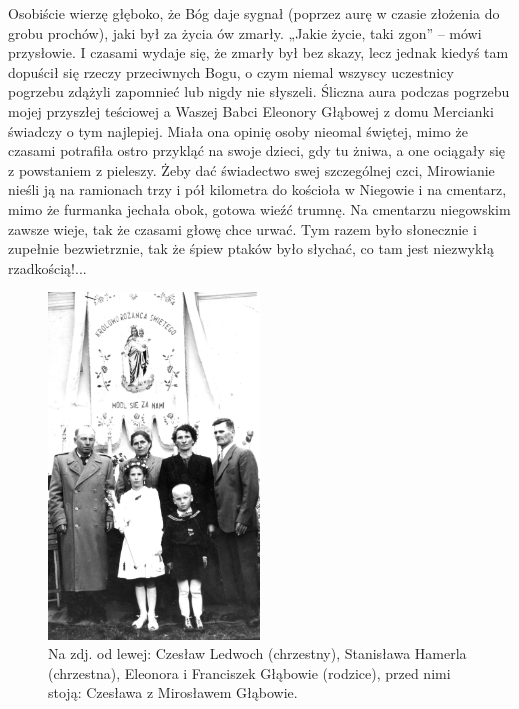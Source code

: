 Osobiście wierzę głęboko, że Bóg daje sygnał (poprzez aurę w czasie złożenia do grobu prochów), jaki był za życia ów zmarły. „Jakie życie, taki zgon” – mówi przysłowie. I czasami wydaje się, że zmarły był bez skazy, lecz jednak kiedyś tam dopuścił się rzeczy przeciwnych Bogu, o czym niemal wszyscy uczestnicy pogrzebu zdążyli zapomnieć lub nigdy nie słyszeli. Śliczna aura podczas pogrzebu mojej przyszłej teściowej a Waszej Babci Eleonory Głąbowej z domu Mercianki świadczy o tym najlepiej. Miała ona opinię osoby nieomal świętej, mimo że czasami potrafiła ostro przykląć na swoje dzieci, gdy tu żniwa, a one ociągały się z powstaniem z pieleszy. Żeby dać świadectwo swej szczególnej czci, Mirowianie nieśli ją na ramionach trzy i pół kilometra do kościoła w Niegowie i na cmentarz, mimo że furmanka jechała obok, gotowa wieźć trumnę. Na cmentarzu niegowskim zawsze wieje, tak że czasami głowę chce urwać. Tym razem było słonecznie i zupełnie bezwietrznie, tak że śpiew ptaków było słychać, co tam jest niezwykłą rzadkością!...
\begin{figure}[!h]
\begin{center}
\includegraphics[width=0.5\textwidth]{photo/czeslawa_glab_komunia.jpg}
\caption[Czesława Głąb u I Komunii św.]{Na zdj. od lewej: Czesław Ledwoch (chrzestny), Stanisława Hamerla (chrzestna), Eleonora i Franciszek Głąbowie (rodzice), przed nimi stoją: Czesława z Mirosławem Głąbowie.}
\end{center}
\end{figure}

